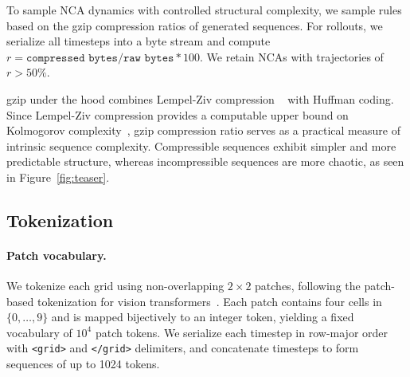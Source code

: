 \documentclass{article}
\newcommand{\dl}[1]{\textcolor{violet}{DL: #1}}
\theoremstyle{plain}
\theoremstyle{definition}
\theoremstyle{remark}
\begin{document}
To sample NCA dynamics with controlled structural complexity, we sample rules based on the gzip compression ratios of generated sequences. For rollouts, we serialize all timesteps into a byte stream and compute $r = \texttt{compressed bytes} / \texttt{raw bytes} * 100$. We retain NCAs with trajectories of $r > 50\%$.

gzip under the hood combines Lempel-Ziv compression ~\citep{lempelziv} with Huffman coding. Since Lempel-Ziv compression provides a computable upper bound on Kolmogorov complexity~\citep{LiVitanyi2019KC4}, gzip compression ratio serves as a practical measure of intrinsic sequence complexity. Compressible sequences exhibit simpler and more predictable structure, whereas incompressible sequences are more chaotic, as seen in Figure~\ref{fig:teaser}. 



\subsection{Tokenization}

\paragraph{Patch vocabulary.}
We tokenize each grid using non-overlapping $2{\times}2$ patches, following the patch-based tokenization for vision transformers~\citep{dosovitskiy2021imageworth16x16words}. Each patch contains four cells in $\{0,\dots,9\}$ and is mapped bijectively to an integer token, yielding a fixed vocabulary of $10^4$ patch tokens. We serialize each timestep in row-major order with \texttt{<grid>} and \texttt{</grid>} delimiters, and concatenate timesteps to form sequences of up to 1024 tokens.
\end{document}
